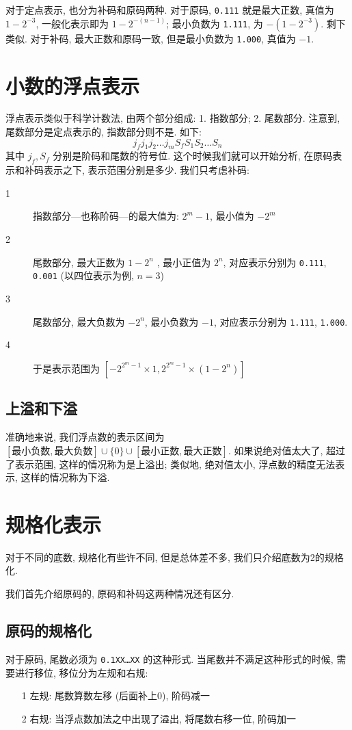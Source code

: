\documentclass[12pt]{ctexart}
\theoremstyle{definition}
\theoremstyle{plain}
\begin{document}
对于定点表示, 也分为补码和原码两种. 对于原码, \texttt{0.111} 就是最大正数, 真值为 \(1 - 2^{-3}\), 一般化表示即为 \(1- 2^{-(n-1)}\); 最小负数为 \texttt{1.111}, 为 \(- (1- 2 ^{ -3})\). 剩下类似. 对于补码, 最大正数和原码一致, 但是最小负数为 \texttt{1.000}, 真值为 \(-1\). 

\section{小数的浮点表示}
浮点表示类似于科学计数法, 由两个部分组成: 1. 指数部分; 2. 尾数部分. 注意到, 尾数部分是定点表示的, 指数部分则不是. 如下:
\begin{equation}
j_{f}j_{1}j_{2}\dots j_{m}S_{f}S_{1}S_{2}\dots S_{n}
\end{equation}
其中 \(j_{f}, S_{f}\) 分别是阶码和尾数的符号位. 这个时候我们就可以开始分析, 在原码表示和补码表示之下, 表示范围分别是多少. 我们只考虑补码:

\begin{description}
\item [1] 指数部分---也称阶码---的最大值为: \(2^{m} -1 \), 最小值为 \(- 2 ^{m}\) 
\item [2] 尾数部分, 最大正数为 \(1-2^{n}\) , 最小正值为 \(2^{n}\), 对应表示分别为 \texttt{0.111}, \texttt{0.001} (以四位表示为例, \(n=3\))
\item [3] 尾数部分, 最大负数为 \(-2 ^{n}\), 最小负数为 \(-1\), 对应表示分别为 \texttt{1.111}, \texttt{1.000}.
\item [4] 于是表示范围为 \( [- 2 ^{2^{m}- 1} \times 1 , 2 ^{2^{m} -1} \times (1 - 2 ^{n} )]\)
\end{description}
\subsection{上溢和下溢}
准确地来说, 我们浮点数的表示区间为 \([\text{最小负数}, \text{最大负数}] \cup \{0\} \cup [\text{最小正数}, \text{最大正数} ]\). 如果说绝对值太大了, 超过了表示范围, 这样的情况称为是上溢出; 类似地, 绝对值太小, 浮点数的精度无法表示, 这样的情况称为下溢. 


\section{规格化表示}
对于不同的底数, 规格化有些许不同, 但是总体差不多, 我们只介绍底数为2的规格化.

我们首先介绍原码的, 原码和补码这两种情况还有区分. 
\subsection{原码的规格化}
对于原码, 尾数必须为 \texttt{0.1XX\dots XX} 的这种形式. 当尾数并不满足这种形式的时候, 需要进行移位, 移位分为左规和右规:
\begin{itemize}
\item [1] 左规: 尾数算数左移 (后面补上0), 阶码减一
\item [2] 右规: 当浮点数加法之中出现了溢出, 将尾数右移一位, 阶码加一
\end{itemize}
\end{document}
